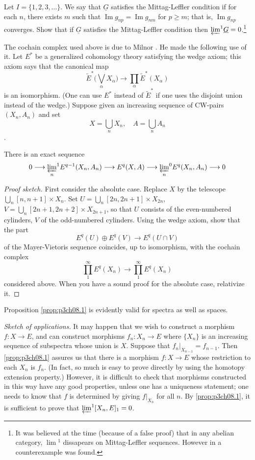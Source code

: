 \documentclass[../main]{subfiles}
\begin{document}
\begin{exercise} \label{ex:p3ch08.ii}
Let $I=\{1,2,3,...\}$. We say that $\underline{G}$ satisfies the Mittag-Leffler condition if for each $n$, there exists $m$ such that $\operatorname{Im}g_{np}=\operatorname{Im}g_{nm}$ for $p\geq m$; that is, $\operatorname{Im}g_{np}$ converges. Show that if $\underline{G}$ satisfies the Mittag-Leffler condition then ${\varprojlim}^1\underline{G}=0$.\footnote{It was believed at the time (because of a false proof) that in any abelian category, $\lim\!^1$ dissapears on Mittag-Leffler sequences. However in \cite{Neeman} a counterexample was found.}
\end{exercise} 
\par The cochain complex used above is due to Milnor \cite{Milnor3}. He made the following use of it. Let $E^*$ be a generalized cohomology theory satisfying the wedge axiom; this axiom says that the canonical map 
\[\tilde{E}^*\bigg(\bigvee_\alpha X_\alpha\bigg)\longrightarrow \prod_\alpha \tilde{E}^*(X_\alpha)\]
is an isomorphism. (One can use $E^*$ instead of $\tilde{E}^*$ if one uses the disjoint union instead of the wedge.) Suppose given an increasing sequence of CW-pairs $(X_n,A_n)$ and set
\[X=\bigcup_n X_n, \quad A=\bigcup_n A_n\].
\begin{proposition}[Milnor] \label{prop:p3ch08.1}
    There is an exact sequence
    \[0\longrightarrow {\varprojlim_n}^1E^{q-1}(X_n,A_n)\longrightarrow E^q(X,A)\longrightarrow {\varprojlim_n}^0E^q(X_n,A_n)\longrightarrow 0\]
\end{proposition}
\begin{proof}[Proof sketch]
First consider the absolute case. Replace $X$ by the telescope\newline $\bigcup_n[n,n+1]\times X_n$. Set $U=\bigcup_n[2n,2n+1]\times X_{2n}$, $V=\bigcup_n[2n+1,2n+2]\times X_{2n+1}$, so that $U$ consists of the even-numbered cylinders, $V$ of the odd-numbered cylinders. Using the wedge axiom, show that the part 
\[E^q(U)\oplus E^q(V)\longrightarrow E^q(U\cap V)\]
of the Mayer-Vietoris sequence coincides, up to isomorphism, with the cochain complex
\[\prod_1^\infty E^q(X_n) \longrightarrow \prod_1^\infty E^q(X_n)\]
considered above. When you have a sound proof for the absolute case, relativize it.
\end{proof}
Proposition \ref{prop:p3ch08.1} is evidently valid for spectra as well as spaces.
\par \emph{Sketch of applications.} It may happen that we wish to construct a morphism $f:X\longrightarrow E$, and can construct morphisms $f_n:X_n\longrightarrow E$ where $\{X_n\}$ is an increasing sequence of subspectra whose union is $X$. Suppose that $f_n|_{X_{n-1}} = f_{n-1}$. Then \ref{prop:p3ch08.1} assures us that there is a morphism $f:X\longrightarrow E$ whose restriction to each $X_n$ is $f_n$. (In fact, so much is easy to prove directly by using the homotopy extension property.) However, it is difficult to check that morphisms constructed in this way have any good properties, unless one has a uniqueness statement; one needs to know that $f$ is determined by giving $f|_{X_n}$ for all $n$. By \ref{prop:p3ch08.1}, it is sufficient to prove that ${\varprojlim}^1[X_n,E]_1=0$.
\end{document}
